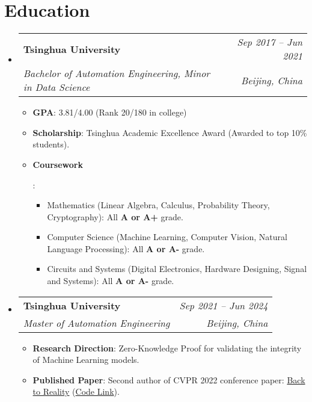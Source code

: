 \documentclass[letterpaper,11pt]{article}
\makeatletter
\newcommand{\resumeItem}[2]{
  \item\small{
    \textbf{#1}{: #2 \vspace{-2pt}}
  }
}
\newcommand{\resumeSubheading}[4]{
  \vspace{0pt}\item
    \begin{tabular*}{0.97\textwidth}[t]{l@{\extracolsep{\fill}}r}
      \textbf{#1} & \textit{\small#2} \\
      \textit{\small#3} & \textit{\small #4} \\
    \end{tabular*}\vspace{-5pt}
}
\newcommand{\resumeSubHeadingListStart}{\begin{itemize}[leftmargin=*]}
\newcommand{\resumeSubHeadingListEnd}{\end{itemize}}
\newcommand{\resumeItemListStart}{\begin{itemize}[leftmargin=*]}
\newcommand{\resumeItemListEnd}{\end{itemize}\vspace{-5pt}}
\newif\ifchinese
\makeatother
\begin{document}
\section{Education}
  \resumeSubHeadingListStart
    \resumeSubheading
      {Tsinghua University}{Sep 2017 -- Jun 2021}
      {Bachelor of Automation Engineering, Minor in Data Science}{Beijing, China}
      \resumeItemListStart
        \resumeItem{GPA}{3.81/4.00 (Rank 20/180 in college)}
        \resumeItem{Scholarship}{Tsinghua Academic Excellence Award (Awarded to top 10\% students).}
        \resumeItem{Coursework}{
          \resumeItemListStart
            \item{Mathematics (Linear Algebra, Calculus, Probability Theory, Cryptography): All \textbf{A or A+} grade.}
            \item{Computer Science (Machine Learning, Computer Vision, Natural Language Processing): All \textbf{A or A-} grade.}
            \item{Circuits and Systems (Digital Electronics, Hardware Designing, Signal and Systems): All \textbf{A or A-} grade.}
          \resumeItemListEnd
        }
      \resumeItemListEnd
    \resumeSubheading
      {Tsinghua University}{Sep 2021 -- Jun 2024}
      {Master of Automation Engineering}{Beijing, China}
      \resumeItemListStart
        \resumeItem{Research Direction}
          {Zero-Knowledge Proof for validating the integrity of Machine Learning models.}
        \resumeItem{Published Paper}
          {Second author of CVPR 2022 conference paper: \href{https://www.researchgate.net/publication/359156581_Back_to_Reality_Weakly-supervised_3D_Object_Detection_with_Shape-guided_Label_Enhancement}{Back to Reality} (\href{https://github.com/wyf-ACCEPT/BackToReality}{Code Link}).}
      \resumeItemListEnd
  \resumeSubHeadingListEnd
\fi




\ifchinese
\end{document}

